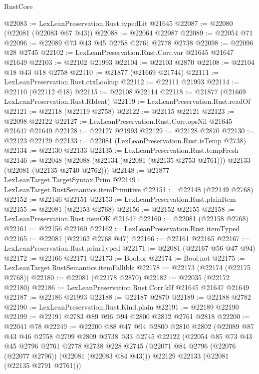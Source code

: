 \begin{lexlean}{RustCore}
\begin{coremodule}
@22083 := LexLeanPreservation.Rust.typedLit @21645
@22087 := @22080 (@22081 (@22083 @67 @43))
@22088 := @22064 @22087
@22089 := @22054 @71
@22096 := @22089 @73 @43 @45 @2758 @2761 @2778 @2738
@22098 := @22096 @28 @2745
@22102 := LexLeanPreservation.Rust.Corr.var @21645 @21647 @21649
@22103 := @22102 @21993
@22104 := @22103 @2870
@22108 := @22104 @18 @43 @18 @2758
@22110 := @21877 (@21669 @21744)
@22111 := LexLeanPreservation.Rust.ctxLookup
@22112 := @22111 @21993
@22114 := @22110 (@22112 @18)
@22115 := @22108 @22114
@22118 := @21877 (@21669 LexLeanPreservation.Rust.RIdent)
@22119 := LexLeanPreservation.Rust.readOf
@22121 := @22118 (@22119 @2758)
@22122 := @22115 @22121
@22123 := @22098 @22122
@22127 := LexLeanPreservation.Rust.Corr.opsNil @21645 @21647 @21649
@22128 := @22127 @21993
@22129 := @22128 @2870
@22130 := @22123 @22129
@22133 := @22081 (LexLeanPreservation.Rust.isTemp @2738)
@22134 := @22130 @22133
@22135 := LexLeanPreservation.Rust.tempFresh
@22146 := @22048
    (@22088 (@22134 (@22081 (@22135 @2753 @2761))) @22133 (@22081 (@22135 @2740 @2762)))
@22148 := @21877 LexLeanTarget.TargetSyntax.Prim
@22149 := LexLeanTarget.RustSemantics.itemPrimitive
@22151 := @22148 (@22149 @2768)
@22152 := @22146 @22151
@22153 := LexLeanPreservation.Rust.plainItem
@22155 := @22081 (@22153 @2768)
@22156 := @22152 @22155
@22158 := LexLeanPreservation.Rust.itemOK @21647
@22160 := @22081 (@22158 @2768)
@22161 := @22156 @22160
@22162 := LexLeanPreservation.Rust.itemTyped
@22165 := @22081 (@22162 @2768 @47)
@22166 := @22161 @22165
@22167 := LexLeanPreservation.Rust.primTyped
@22171 := @22081 (@22167 @56 @47 @94)
@22172 := @22166 @22171
@22173 := Bool.or
@22174 := Bool.not
@22175 := LexLeanTarget.RustSemantics.itemFallible
@22178 := @22173 (@22174 (@22175 @2768))
@22180 := @22081 (@22178 @2870)
@22182 := @22035 (@22172 @22180)
@22186 := LexLeanPreservation.Rust.Corr.kIf @21645 @21647 @21649
@22187 := @22186 @21993
@22188 := @22187 @2870
@22189 := @22188 @2782
@22190 := LexLeanPreservation.Rust.Kind.plain
@22191 := @22189 @22190
@22199 := @22191 @2783 @89 @96 @94 @2800 @2812 @2761 @2818
@22200 := @22041 @78
@22249 := @22200
    @88
    @47
    @94
    @2800
    @2810
    @2802
    (@22089
      @87
      @43
      @46
      @2758
      @2799
      @2809
      @2738
      @33
      @2745
      @22122
      (@22054
        @85
        @73
        @43
        @45
        @2796
        @2761
        @2778
        @2738
        @228
        @2745
        (@22071 @84 @2796 (@22076 (@22077 @2796)) (@22081 (@22083 @84 @43)))
        @22129
        @22133
        (@22081 (@22135 @2791 @2761)))

\end{coremodule}
\end{lexlean}
